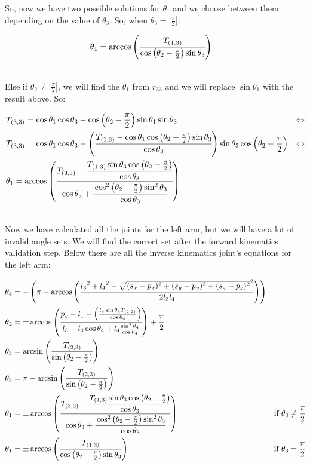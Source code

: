 So, now we have two possible solutions for \(\theta_1\) and we choose between them depending on the value of \(\theta_3\). So, when $\theta_3 = \left|\frac{\pi}{2}\right|$:
\begin{small}
\begin{align*}
&\theta_1 = \arccos\left(\cfrac{T_{(1,3)}}{\cos\left(\theta_2 - \frac{\pi}{2}\right)\sin\theta_3}\right)
\end{align*}
\end{small}\\
Else if \(\theta_2 \neq \left|\frac{\pi}{2}\right|\), we will find the \(\theta_1\) from \(r_{33}\) and we will replace \(\sin\theta_1\) with the result above. So:
\begin{small}
\begin{align*}
&T_{(3,3)} = \cos\theta_1\cos\theta_3 - \cos\left(\theta_2 - \frac{\pi}{2}\right)\sin\theta_1\sin\theta_3 &\Leftrightarrow \\
&T_{(3,3)} = \cos\theta_1\cos\theta_3 - \left(\cfrac{T_{(1,3)} - \cos\theta_1\cos\left(\theta_2 - \frac{\pi}{2}\right)\sin\theta_3}{\cos\theta_3}\right)\sin\theta_3\cos\left(\theta_2 - \frac{\pi}{2}\right) &\Leftrightarrow \\
&\theta_1 = \arccos\left(\cfrac{T_{(3,3)} -\cfrac{ T_{(1,3)}\sin\theta_3\cos\left(\theta_2 - \frac{\pi}{2}\right)}{\cos\theta_3}}{\cos\theta_3 + \cfrac{\cos^2\left(\theta_2-\frac{\pi}{2}\right)\sin^2\theta_3}{\cos\theta_3}}\right)
\end{align*}
\end{small}\\
Now we have calculated all the joints for the left arm, but we will have a lot of invalid angle sets. We will find the correct set after the forward kinematics validation step. Below there are all the inverse kinematics joint's equations for the left arm:

\begin{small}
\begin{align*}
\theta_4 &= -\left(\pi - \arccos\left(\cfrac{{l_3}^2 + {l_4}^2 - \sqrt{(s_x-p_x)^2 + (s_y-p_y)^2 + (s_z-p_z)^2}^2 }{2 l_3 l_4}\right)\right)\\
\theta_2 &= \pm\arccos\left(\cfrac{p_y - l_1 - \left(\frac{l_4\sin\theta_4 T_{(2,2)}}{\cos\theta_4}\right)}{l_3 +l_4\cos\theta_4 + l_4\frac{\sin^2\theta_4}{\cos\theta_4}}\right)+\cfrac{\pi}{2}\\
\theta_3 &= \arcsin\left(\cfrac{T_{(2,3)}}{\sin\left(\theta_2-\frac{\pi}{2}\right)}\right)\\
\theta_3 &= \pi - \arcsin\left(\frac{T_{(2,3)}}{\sin\left(\theta_2-\frac{\pi}{2}\right)}\right)\\
\theta_1 &= \pm\arccos\left(\cfrac{T_{(3,3)} - \cfrac{T_{(1,3)}\sin\theta_3\cos\left(\theta_2 - \frac{\pi}{2}\right)}{\cos\theta_3}}{\cos\theta_3 + \cfrac{\cos^2\left(\theta_2-\frac{\pi}{2}\right)\sin^2\theta_3}{\cos\theta_3}}\right) &\text{if } \theta_3 \neq \cfrac{\pi}{2}\\
\theta_1 &= \pm\arccos\left(\cfrac{T_{(1,3)}}{\cos\left(\theta_2 - \frac{\pi}{2}\right)\sin\theta_3}\right) &\text{if } \theta_3 = \cfrac{\pi}{2}
\end{align*}
\end{small}


